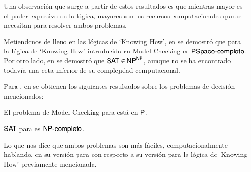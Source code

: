 Una observación que surge a partir de estos resultados es que mientras mayor es el poder expresivo de la lógica, mayores son los recursos 
computacionales que se necesitan para resolver ambos problemas.

Metiendonos de lleno en las lógicas de `Knowing How', en \cite{Demri_Fervari_2023} se demostró que para la lógica de `Knowing How' introducida 
en \cite{Wang15KH,Wang2018GoalDirectedKH} Model Checking es $\rm\textsf{PSpace-completo}$. Por otro lado, en \cite{SAT_Upper_Bound} se demostró que 
$\rm\textsf{SAT} \in \rm\textsf{NP}^{\rm\textsf{NP}}$, aunque no se ha encontrado todavía una cota inferior de su complejidad computacional.

Para \KHilogic, en \cite{ArecesFSV25,SaraviaPHD} se obtienen los siguientes resultados sobre los problemas de decisión mencionados:
\begin{teorema}\label{thm:model-checking-poly}
    El problema de Model Checking para \KHilogic está en $\rm\textsf{P}$.
\end{teorema}

\begin{teorema}
    $\rm\textsf{SAT}$ para \KHilogic es $\rm\textsf{NP-completo}$.
\end{teorema}

Lo que nos dice que ambos problemas son más fáciles, computacionalmente hablando, en su versión para \KHilogic con respecto a su versión para 
la lógica de `Knowing How' previamente mencionada.